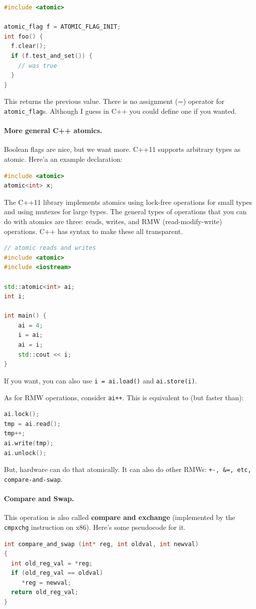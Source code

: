 \documentclass[a4paper]{report}
\begin{document}
\begin{lstlisting}[language=C++]
#include <atomic>

atomic_flag f = ATOMIC_FLAG_INIT;
int foo() {
  f.clear();
  if (f.test_and_set()) {
    // was true
  }
}
\end{lstlisting}

This returns the previous value. There is no assignment (=) operator for {\tt atomic\_flag}s. Although I guess in C++ you could define one if you wanted. 

\paragraph{More general C++ atomics.} Boolean flags are nice, but we want more.
C++11 supports arbitrary types as atomic. Here'a an example declaration:

\begin{lstlisting}[language=C++]
#include <atomic>
atomic<int> x;
\end{lstlisting}

The C++11 library implements atomics using lock-free operations for small types
and using mutexes for large types. The general types of operations that you can do with atomics are three: reads, writes, and RMW (read-modify-write) operations. C++ has syntax to make these all transparent.

\begin{lstlisting}[language=C++]
// atomic reads and writes
#include <atomic>
#include <iostream>

std::atomic<int> ai;
int i;

int main() {
    ai = 4;
    i = ai;
    ai = i;
    std::cout << i;
}
\end{lstlisting}
If you want, you can also use {\tt i = ai.load()} and {\tt ai.store(i)}.

As for RMW operations, consider {\tt ai++}. This is equivalent to (but faster than):

\begin{lstlisting}[language=C++]
ai.lock();
tmp = ai.read(); 
tmp++; 
ai.write(tmp);
ai.unlock();
\end{lstlisting}
But, hardware can do that atomically. It can also do other RMWs: {\tt +-, \&=, etc, compare-and-swap}.

\paragraph{Compare and Swap.} This operation is also called {\bf compare and exchange} (implemented by the {\tt cmpxchg} instruction on x86).
Here's some pseudocode for it.
  \begin{lstlisting}[language=C]
int compare_and_swap (int* reg, int oldval, int newval) 
{
  int old_reg_val = *reg;
  if (old_reg_val == oldval) 
     *reg = newval;
  return old_reg_val;
}
  \end{lstlisting}
\end{document}
